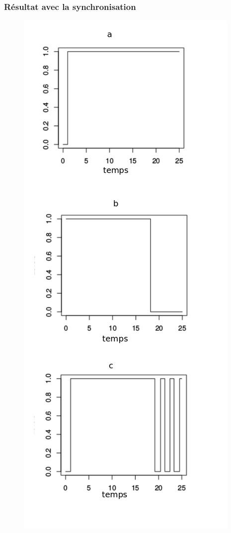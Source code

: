 \begin{frame}
\frametitle{Résultat avec la synchronisation}
% 
% 
% 

\begin{figure}[!h]
   \begin{minipage}[c]{.46\linewidth}
      \centering
      \includegraphics[scale=0.2]{figs/oscillation.png}

\end{minipage}
\end{figure}
\end{frame}
